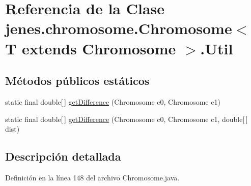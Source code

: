 \hypertarget{classjenes_1_1chromosome_1_1_chromosome_3_01_t_01extends_01_chromosome_01_4_1_1_util}{\section{Referencia de la Clase jenes.\-chromosome.\-Chromosome$<$ T extends Chromosome $>$.Util}
\label{classjenes_1_1chromosome_1_1_chromosome_3_01_t_01extends_01_chromosome_01_4_1_1_util}
}
\subsection*{Métodos públicos estáticos}
\begin{DoxyCompactItemize}
\item 
static final double\mbox{[}$\,$\mbox{]} \hyperlink{classjenes_1_1chromosome_1_1_chromosome_3_01_t_01extends_01_chromosome_01_4_1_1_util_a0c295f1ee65108c934fbe03c1c7c849e}{get\-Difference} (Chromosome c0, Chromosome c1)
\item 
static final double\mbox{[}$\,$\mbox{]} \hyperlink{classjenes_1_1chromosome_1_1_chromosome_3_01_t_01extends_01_chromosome_01_4_1_1_util_aa9c40ae514b0f60b28f678ba7dc1d95c}{get\-Difference} (Chromosome c0, Chromosome c1, double\mbox{[}$\,$\mbox{]} dist)
\end{DoxyCompactItemize}


\subsection{Descripción detallada}


Definición en la línea 148 del archivo Chromosome.\-java.



